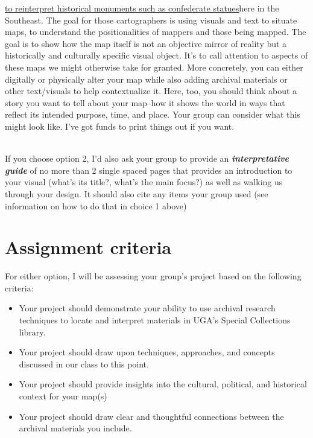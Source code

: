 \documentclass[
  letterpaper,
  DIV=11,
  numbers=noendperiod]{scrartcl}
\begin{document}
\begin{enumerate}
  \href{https://hyperallergic.com/remagining-monuments-to-make-them-resonate-locally-and-personally/}{to
  reinterpret historical monuments such as confederate statues}here in
  the Southeast. The goal for those cartographers is using visuals and
  text to situate maps, to understand the positionalities of mappers and
  those being mapped. The goal is to show how the map itself is not an
  objective mirror of reality but a historically and culturally specific
  visual object. It's to call attention to aspects of these maps we
  might otherwise take for granted. More concretely, you can either
  digitally or physically alter your map while also adding archival
  materials or other text/visuals to help contextualize it. Here, too,
  you should think about a story you want to tell about your map--how it
  shows the world in ways that reflect its intended purpose, time, and
  place. Your group can consider what this might look like. I've got
  funds to print things out if you want.\\
  \strut \\
  If you choose option 2, I'd also ask your group to provide an
  \textbf{\emph{interpretative guide}} of no more than 2 single spaced
  pages that provides an introduction to your visual (what's its title?,
  what's the main focus?) as well as walking us through your design. It
  should also cite any items your group used (see information on how to
  do that in choice 1 above)
\end{enumerate}

\section{Assignment criteria}\label{assignment-criteria}

For either option, I will be assessing your group's project based on the
following criteria:

\begin{itemize}
\item
  Your project should demonstrate your ability to use archival research
  techniques to locate and interpret materials in UGA's Special
  Collections library.
\item
  Your project should draw upon techniques, approaches, and concepts
  discussed in our class to this point.
\item
  Your project should provide insights into the cultural, political, and
  historical context for your map(s)
\item
  Your project should draw clear and thoughtful connections between the
  archival materials you include.
\end{itemize}
\end{document}
